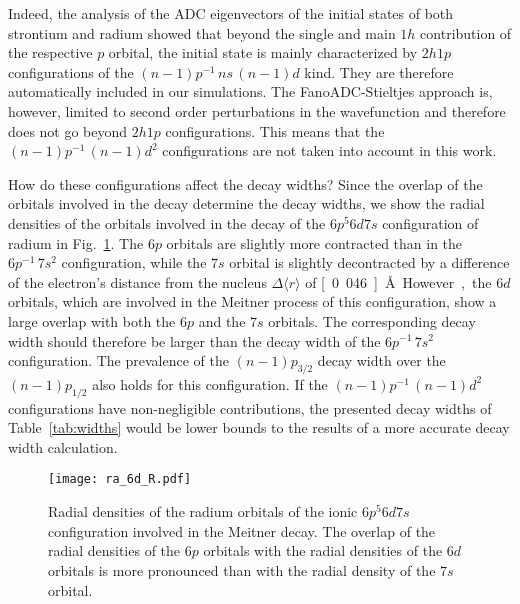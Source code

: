 \documentclass[aps,amssymb,preprint,a4paper]{revtex4}
\begin{document}
Indeed, the analysis of the ADC eigenvectors of the initial states of both
strontium and radium showed
that beyond the single and main $1h$ contribution of the respective $p$ orbital, the
initial state is mainly characterized by $2h1p$ configurations of the
$(n-1)p^{-1} \,ns \, (n-1)d$ kind. They
are therefore automatically included in our simulations.
The FanoADC-Stieltjes approach is, however, limited
to second order perturbations in the wavefunction
and therefore does not go beyond $2h1p$ configurations. This means that the
$(n-1)p^{-1} \,(n-1)d^2$ configurations are not taken into account in this work.

How do these configurations affect the decay widths? Since the overlap of the
orbitals involved in the decay determine the decay widths, we show the
radial densities of the orbitals involved in the decay of the $6p^5 6d 7s$
configuration of radium in Fig.~\ref{fig:radial_ra}.
The $6p$ orbitals are slightly more contracted than in the $6p^{-1} \,7s^2$
configuration, while the $7s$ orbital is slightly decontracted by a difference
of the electron's distance from the nucleus $\Delta \langle r \rangle$
of \unit[0.046]{\AA}.
However, the $6d$ orbitals, which are involved
in the Meitner process of this configuration, show a large overlap with both
the $6p$ and the $7s$ orbitals. The corresponding decay width should therefore
be larger than the decay width of the $6p^{-1} \,7s^2$ configuration.
The prevalence of the $(n-1)p_{3/2}$ decay width over the $(n-1)p_{1/2}$
also holds for this configuration.
If the $(n-1)p^{-1} \,(n-1)d^2$ configurations
have non-negligible contributions,
the presented decay widths of Table~\ref{tab:widths} would be
lower bounds to the results of a more accurate decay width calculation.

\begin{figure}[h]
 \centering
 \texttt{[image: ra\_6d\_R.pdf]}
 \caption{Radial densities of the radium orbitals of the ionic $6p^5 6d 7s$
          configuration involved in the Meitner decay. The overlap of the radial
          densities of the $6p$ orbitals with the radial densities of the $6d$ orbitals
          is more pronounced than with the radial density of the $7s$ orbital.}
 \label{fig:radial_ra}
\end{figure}
\end{document}
